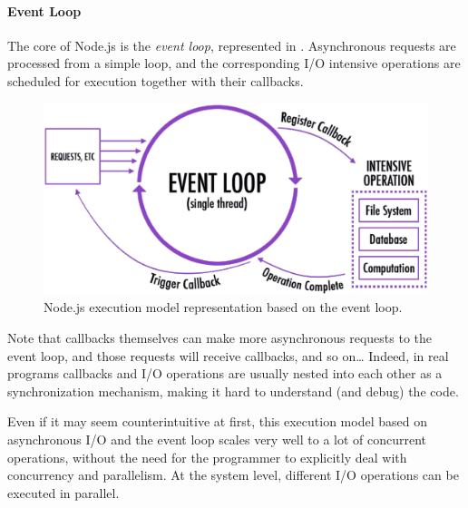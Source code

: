 \paragraph{Event Loop}
The core of Node.js is the \emph{event loop}, represented in .
Asynchronous requests are processed from a simple loop, and the corresponding I/O intensive operations are scheduled for execution together with their callbacks.

\begin{figure}[h]
	\centering
	\includegraphics[width=.7\textwidth]{fig/event-loop}
	\caption{Node.js execution model representation based on the event loop.}
	\label{fig:eventloop}
\end{figure}

Note that callbacks themselves can make more asynchronous requests to the event loop, and those requests will receive callbacks, and so on\dots{}
Indeed, in real programs callbacks and I/O operations are usually nested into each other as a synchronization mechanism, making it hard to understand (and debug) the code.

Even if it may seem counterintuitive at first, this execution model based on asynchronous I/O and the event loop scales very well to a lot of concurrent operations, without the need for the programmer to explicitly deal with concurrency and parallelism.
At the system level, different I/O operations can be executed in parallel.
